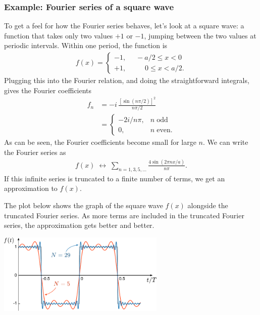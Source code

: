 \documentclass[10pt,a4paper]{article}
\begin{document}
\subsubsection{Example: Fourier series of a square wave}
\label{example-fourier-series-of-a-square-wave}

To get a feel for how the Fourier series behaves, let's look at a
square wave: a function that takes only two values $+1$ or $-1$,
jumping between the two values at periodic intervals.  Within one
period, the function is
\begin{align}
  f(x) = \left\{\begin{array}{ll}-1, & \;\;-a/2 \le x < 0 \\ +1, & \quad\;\;\; 0 \le x < a/2.\end{array}\right.
\end{align}
Plugging this into the Fourier relation, and doing the straightforward
integrals, gives the Fourier coefficients
\begin{align}
  f_n &= -i \, \frac{\left[\sin\left(n \pi/2\right)\right]^2}{n\pi/2 } \\
  &= \left\{\begin{array}{cl} -2i/n\pi ,& n \; \mathrm{odd} \\
  0,& n \; \mathrm{even}. \end{array}\right.
\end{align}
As can be seen, the Fourier coefficients become small for large $n$.
We can write the Fourier series as
\begin{align}
  f(x) \; \leftrightarrow \; \sum_{n=1,3,5,\dots} \frac{4\sin(2\pi n x / a)}{n \pi}.
\end{align}
If this infinite series is truncated to a finite number of terms, we
get an approximation to $f(x)$.

The plot below shows the graph of the square wave $f(x)$ alongside the
truncated Fourier series. As more terms are included in the truncated
Fourier series, the approximation gets better and better.

\begin{center}
  \includegraphics[width=0.6\textwidth]{square_fourier}
\end{center}
\end{document}
